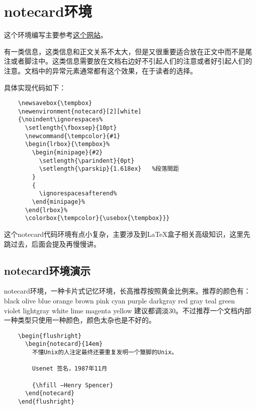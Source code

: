 \documentclass[11pt,oneside]{book}
\begin{document}
  \section{notecard环境}
  这个环境编写主要参考\href{http://tex.stackexchange.com/questions/127612/color-text-and-bg-of-verbatim-without-affecting-fancyvrb-line-numbers}{这个网站}。

  有一类信息，这类信息和正文关系不太大，但是又很重要适合放在正文中而不是尾注或者脚注中。这类信息需要放在文档右边好不引起人们的注意或者好引起人们的注意。文档中的异常元素通常都有这个效果，在于读者的选择。

  具体实现代码如下：
  \begin{Verbatim}
    \newsavebox{\tempbox}
    \newenvironment{notecard}[2][white]
    {\noindent\ignorespaces%
      \setlength{\fboxsep}{10pt}
      \newcommand{\tempcolor}{#1}
      \begin{lrbox}{\tempbox}%
        \begin{minipage}{#2}
          \setlength{\parindent}{0pt}
          \setlength{\parskip}{1.618ex}   %段落間距
        }
        {
          \ignorespacesafterend%
        \end{minipage}%
      \end{lrbox}%
      \colorbox{\tempcolor}{\usebox{\tempbox}}}
  \end{Verbatim}

  这个notecard代码环境有点小复杂，主要涉及到\LaTeX 盒子相关高级知识，这里先跳过去，后面会提及再慢慢讲。


  \subsection{notecard环境演示}
  notecard环境，一种卡片式记忆环境，长高推荐按照黄金比例来。推荐的颜色有：black olive blue orange brown pink cyan purple darkgray red gray teal green violet lightgray white lime magenta yellow 建议都调淡30。不过推荐一个文档内部一种类型只使用一种颜色，颜色太杂也是不好的。

  \begin{Verbatim}
    \begin{flushright}
      \begin{notecard}{14em}
        不懂Unix的人注定最终还要重复发明一个蹩脚的Unix。

        Usenet 签名，1987年11月

        {\hfill —Henry Spencer}
      \end{notecard}
    \end{flushright}
  \end{Verbatim}
\end{document}
